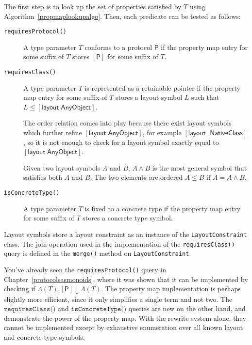 \documentclass[a4paper,headsepline,bibliography=totoc,toc=flat,fleqn,twoside=semi]{scrbook}
\theoremstyle{definition}
\theoremstyle{definition}
\theoremstyle{definition}
\newcommand{\proto}[1]{\bm{\mathsf{#1}}}
\newcommand{\protosym}[1]{[\proto{#1}]}
\newcommand{\layoutsym}[1]{[\mathsf{layout\;#1}]}
\begin{document}
The first step is to look up the set of properties satisfied by $T$ using Algorithm~\ref{propmaplookupalgo}. Then, each predicate can be tested as follows:
\begin{description}
\item[\texttt{requiresProtocol()}] A type parameter $T$ conforms to a protocol $\proto{P}$ if the property map entry for some suffix of $T$ stores $\protosym{P}$ for some suffix of $T$.
\item[\texttt{requiresClass()}] A type parameter $T$ is represented as a retainable pointer if the property map entry for some suffix of $T$ stores a layout symbol $L$ such that $L\leq\layoutsym{AnyObject}$.

The order relation comes into play because there exist layout symbols which further refine $\layoutsym{AnyObject}$, for example $\layoutsym{\_NativeClass}$, so it is not enough to check for a layout symbol exactly equal to $\layoutsym{AnyObject}$.

Given two layout symbols $A$ and $B$, $A\wedge B$ is the most general symbol that satisfies both $A$ and $B$. The two elements are ordered $A\leq B$ if $A=A\wedge B$.
\item[\texttt{isConcreteType()}] A type parameter $T$ is fixed to a concrete type if the property map entry for some suffix of $T$ stores a concrete type symbol.
\end{description}

Layout symbols store a layout constraint as an instance of the \texttt{LayoutConstraint} class. The join operation used in the implementation of the \texttt{requiresClass()} query is defined in the \texttt{merge()} method on \texttt{LayoutConstraint}.

You've already seen the \texttt{requiresProtocol()} query in Chapter~\ref{protocolsasmonoids}, where it was shown that it can be implemented by checking if $\Lambda(T).\protosym{P}\downarrow\Lambda(T)$. The property map implementation is perhaps slightly more efficient, since it only simplifies a single term and not two. The $\texttt{requiresClass()}$ and $\texttt{isConcreteType()}$ queries are new on the other hand, and demonstrate the power of the property map. With the rewrite system alone, they cannot be implemented except by exhaustive enumeration over all known layout and concrete type symbols.
\end{document}
